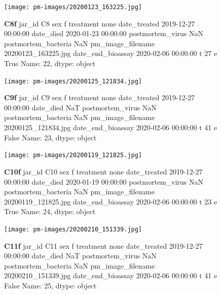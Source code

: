 \begin{figure}[h!]
\centering
\texttt{[image: pm-images/20200123\_163225.jpg]}
\caption{\textbf{C8f} jar\_id                                  C8
sex                                      f
treatment                             none
date\_treated           2019-12-27 00:00:00
date\_died              2020-01-23 00:00:00
postmortem\_virus                       NaN
postmortem\_bacteria                    NaN
pm\_image\_filename      20200123\_163225.jpg
date\_end\_bioassay      2020-02-06 00:00:00
t                                       27
e                                     True
Name: 22, dtype: object}
\end{figure}
\clearpage

\begin{figure}[h!]
\centering
\texttt{[image: pm-images/20200125\_121834.jpg]}
\caption{\textbf{C9f} jar\_id                                  C9
sex                                      f
treatment                             none
date\_treated           2019-12-27 00:00:00
date\_died                              NaT
postmortem\_virus                       NaN
postmortem\_bacteria                    NaN
pm\_image\_filename      20200125\_121834.jpg
date\_end\_bioassay      2020-02-06 00:00:00
t                                       41
e                                    False
Name: 23, dtype: object}
\end{figure}
\clearpage

\begin{figure}[h!]
\centering
\texttt{[image: pm-images/20200119\_121825.jpg]}
\caption{\textbf{C10f} jar\_id                                 C10
sex                                      f
treatment                             none
date\_treated           2019-12-27 00:00:00
date\_died              2020-01-19 00:00:00
postmortem\_virus                       NaN
postmortem\_bacteria                    NaN
pm\_image\_filename      20200119\_121825.jpg
date\_end\_bioassay      2020-02-06 00:00:00
t                                       23
e                                     True
Name: 24, dtype: object}
\end{figure}
\clearpage

\begin{figure}[h!]
\centering
\texttt{[image: pm-images/20200210\_151339.jpg]}
\caption{\textbf{C11f} jar\_id                                 C11
sex                                      f
treatment                             none
date\_treated           2019-12-27 00:00:00
date\_died                              NaT
postmortem\_virus                       NaN
postmortem\_bacteria                    NaN
pm\_image\_filename      20200210\_151339.jpg
date\_end\_bioassay      2020-02-06 00:00:00
t                                       41
e                                    False
Name: 25, dtype: object}
\end{figure}
\clearpage

